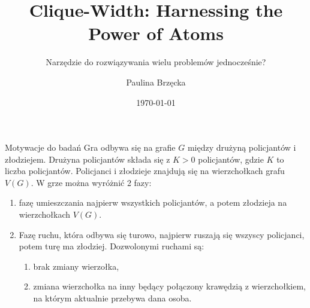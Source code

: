 \documentclass[polish]{beamer}
\title[Clique-Width: Harnessing the Power of Atoms]{Clique-Width: Harnessing the Power of Atoms}
\subtitle{Narzędzie do rozwiązywania wielu problemów jednocześnie?}
\author{Paulina Brzęcka}
\date{\today}
\begin{document}

\pgtitleframe



\begin{frame}{Motywacje do badań}
Gra odbywa się na grafie $G$ między drużyną policjantów i złodziejem. 
Drużyna policjantów składa się z $K>0$ policjantów, gdzie $K$ to liczba policjantów.
Policjanci i złodzieje znajdują się na wierzchołkach grafu $V\left(G\right)$.
W grze można wyróżnić 2 fazy:
    \begin{enumerate}
        \item fazę umieszczania najpierw wszystkich policjantów, a potem złodzieja na wierzchołkach $V\left(G\right)$.
        \item Fazę ruchu, która odbywa się turowo, najpierw ruszają się wszyscy policjanci, potem turę ma złodziej. 
        Dozwolonymi ruchami są:
        \begin{enumerate}
            \item brak zmiany wierzołka,
            \item zmiana wierzchołka na inny będący połączony krawędzią z wierzchołkiem, 
            na którym aktualnie przebywa dana osoba.
        \end{enumerate} 
    \end{enumerate}
\end{frame}
\end{document}
